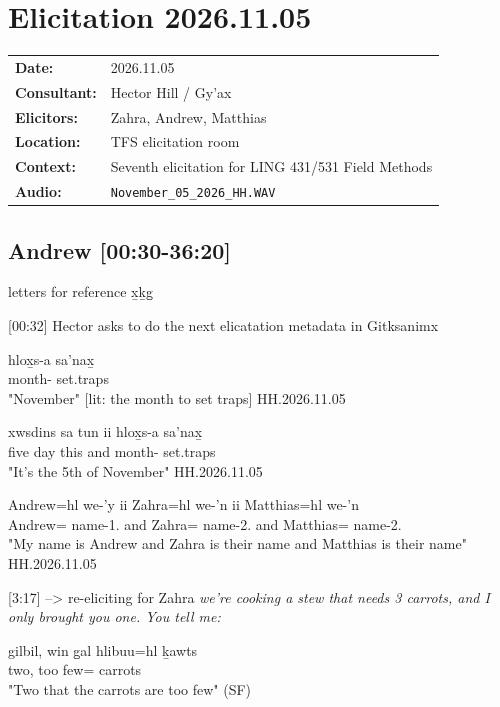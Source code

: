 \renewcommand{\ElicitationDate}{2026.11.05}

\section{Elicitation \ElicitationDate}

\begin{tabular}{ll}
\textbf{Date:} & \ElicitationDate \\
\textbf{Consultant:} & Hector Hill / Gy'ax \\
\textbf{Elicitors:} & Zahra, Andrew, Matthias \\
\textbf{Location:} & TFS elicitation room \\
\textbf{Context:} & Seventh elicitation for LING 431/531 Field Methods \\
\textbf{Audio:} & \texttt{November\_05\_2026\_HH.WAV} \\
\end{tabular}

\subsection{Andrew [00:30-36:20]}

letters for reference x̱ḵg̱

[00:32]
Hector asks to do the next elicatation metadata in Gitksanimx
\begin{exe}
\ex \begin{xlist}
\item \gll
hlox̱s-a sa'nax̱\\
month-\Attr{} set.traps\\
\glt "November" [lit: the month to set traps] \hfill HH.\ElicitationDate{}
\item \gll
xwsdins sa tun ii hlox̱s-a sa'nax̱\\
five day this and month-\Attr{} set.traps\\
\glt "It's the 5th of November" \hfill HH.\ElicitationDate{}
\item \gll
Andrew=hl we-'y ii Zahra=hl we-'n ii Matthias=hl we-'n\\
Andrew=\Cn{} name-1.\Ii{} and Zahra=\Cn{} name-2.\Ii{} and Matthias=\Cn{} name-2.\Ii{}\\
\glt "My name is Andrew and Zahra is their name and Matthias is their name" \hfill HH.\ElicitationDate{}
\end{xlist}
\end{exe}

[3:17] --> re-eliciting for Zahra \textit{we're cooking a stew that needs 3 carrots, and I only brought you one. You tell me:}
\begin{exe}
\ex \gll
gilbil, win g̱al hlibuu=hl ḵawts \\
two, \Comp{} too few=\Cn{} carrots\\
\glt "Two that the carrots are too few" (SF)
\end{exe}

